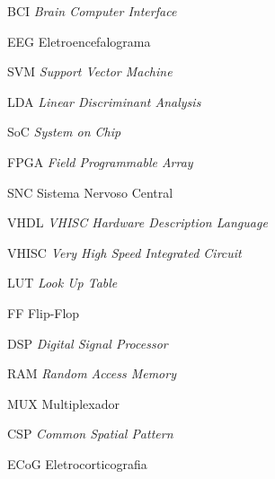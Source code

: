 \begin{siglas}
  \item[BCI] \textit{Brain Computer Interface}
  \item[EEG] Eletroencefalograma
  \item[SVM] \textit{Support Vector Machine}
  \item[LDA] \textit{Linear Discriminant Analysis}
  \item[SoC] \textit{System on Chip}
  \item[FPGA] \textit{Field Programmable Array}
  \item[SNC] Sistema Nervoso Central
  \item[VHDL] \textit{VHISC Hardware Description Language}
  \item[VHISC] \textit{Very High Speed Integrated Circuit}
  \item[LUT] \textit{Look Up Table}
  \item[FF] Flip-Flop
  \item[DSP] \textit{Digital Signal Processor}
  \item[RAM] \textit{Random Access Memory}
  \item[MUX] Multiplexador
  \item[CSP] \textit{Common Spatial Pattern}
  \item[ECoG] Eletrocorticografia
  

\end{siglas}
